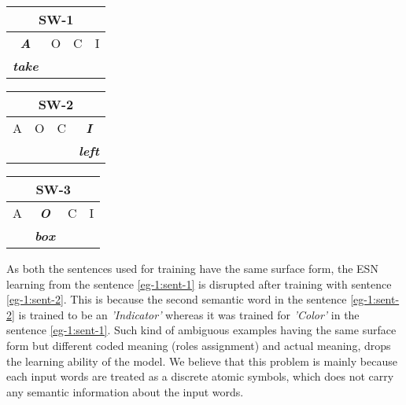 \begin{table}[hbtp]
\centering
\begin{minipage}{1.5in}
\begin{tabular}{|c|c|c|c|}
\hline
\multicolumn{4}{|c|}{\textbf{SW-1}}   \\ \hline
\textit{\textbf{A}}    & O & C & I \\ \hline
\textit{\textbf{take}} &   &   &  \\  \hline
\end{tabular}
\end{minipage}
\begin{minipage}{1.5in}
\begin{tabular}{|c|c|c|c|}
\hline
\multicolumn{4}{|c|}{\textbf{SW-2}}                    \\ \hline
A       & O & C    & \textit{\textbf{I}} \\ \hline
 &   &  & \textit{\textbf{left}} \\ \hline
\end{tabular}
\end{minipage}
\begin{minipage}{1.5in}
\begin{tabular}{|c|c|c|c|}
\hline
\multicolumn{4}{|c|}{\textbf{SW-3}}                                  \\ \hline
A                  & \textit{\textbf{O}}   & C                  & I \\ \hline
 & \textit{\textbf{box}} & \textit{\textbf{}} &   \\ \hline
\end{tabular}
\end{minipage}
\end{table}

As both the sentences used for training have the same surface form, the ESN learning from the sentence \ref{eg-1:sent-1} is disrupted after training with sentence \ref{eg-1:sent-2}. This is because the second semantic word in the sentence \ref{eg-1:sent-2} is trained to be an \textit{'Indicator'} whereas it was trained for \textit{'Color'} in the sentence \ref{eg-1:sent-1}. Such kind of ambiguous examples having the same surface form but different coded meaning (roles assignment) and actual meaning, drops the learning ability of the model. We believe that this problem is mainly because each input words are treated as a discrete atomic symbols, which does not carry any semantic information about the input words.

